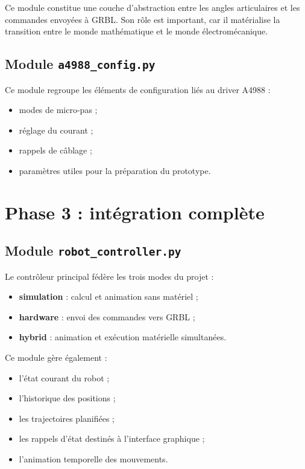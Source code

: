 \documentclass[12pt,a4paper]{report}
\begin{document}
Ce module constitue une couche d'abstraction entre les angles articulaires et les
commandes envoyées à GRBL. Son rôle est important, car il matérialise la transition
entre le monde mathématique et le monde électromécanique.

\subsection{Module \texttt{a4988\_config.py}}

Ce module regroupe les éléments de configuration liés au driver A4988 :

\begin{itemize}
    \item modes de micro-pas ;
    \item réglage du courant ;
    \item rappels de câblage ;
    \item paramètres utiles pour la préparation du prototype.
\end{itemize}

\section{Phase 3 : intégration complète}

\subsection{Module \texttt{robot\_controller.py}}

Le contrôleur principal fédère les trois modes du projet :

\begin{itemize}
    \item \textbf{simulation} : calcul et animation sans matériel ;
    \item \textbf{hardware} : envoi des commandes vers GRBL ;
    \item \textbf{hybrid} : animation et exécution matérielle simultanées.
\end{itemize}

Ce module gère également :

\begin{itemize}
    \item l'état courant du robot ;
    \item l'historique des positions ;
    \item les trajectoires planifiées ;
    \item les rappels d'état destinés à l'interface graphique ;
    \item l'animation temporelle des mouvements.
\end{itemize}
\end{document}
